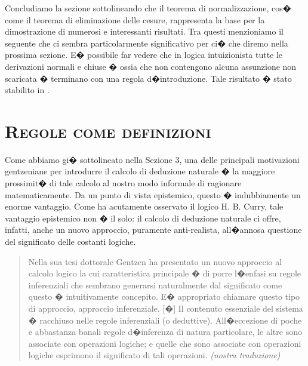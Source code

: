 \documentclass[a4paper,12pt]{aphex}
\begin{document}
Concludiamo la sezione sottolineando che il teorema di normalizzazione, cos� come il teorema di eliminazione delle cesure, rappresenta la base per la dimostrazione di numerosi e interessanti risultati. Tra questi menzioniamo il seguente che ci sembra particolarmente significativo per ci� che diremo nella prossima sezione. E� possibile far vedere che in logica intuizionista tutte le derivazioni normali e chiuse � ossia che non contengono alcuna assunzione non scaricata � terminano con una regola d�introduzione. Tale risultato � stato stabilito in \cite{Prawitz}.


\section{\textsc{Regole come definizioni}}

Come abbiamo gi� sottolineato nella Sezione 3, una delle principali motivazioni gentzeniane per introdurre il calcolo di deduzione naturale � la maggiore prossimit� di tale calcolo al nostro modo informale di ragionare matematicamente. Da un punto di vista epistemico, questo � indubbiamente un enorme vantaggio. Come ha acutamente osservato il logico H. B. Curry, tale vantaggio epistemico non � il solo: il calcolo di deduzione naturale ci offre, infatti, anche un nuovo approccio, puramente anti-realista, all�annosa questione del significato delle costanti logiche.

\begin{quotation}
Nella sua tesi dottorale Gentzen ha presentato un nuovo approccio al calcolo logico la cui caratteristica principale � di porre l�enfasi su regole inferenziali che sembrano generarsi naturalmente dal significato come questo � intuitivamente concepito. E� appropriato chiamare questo tipo di approccio, approccio inferenziale. [�]
Il contenuto essenziale del sistema � racchiuso nelle regole inferenziali (o deduttive). All�eccezione di poche e abbastanza banali regole d�inferenza di natura particolare, le altre sono associate con operazioni logiche; e quelle che sono associate con operazioni logiche esprimono il significato di tali operazioni. \cite[119-120]{curry}\emph{(nostra traduzione)}
\end{quotation}
\end{document}
